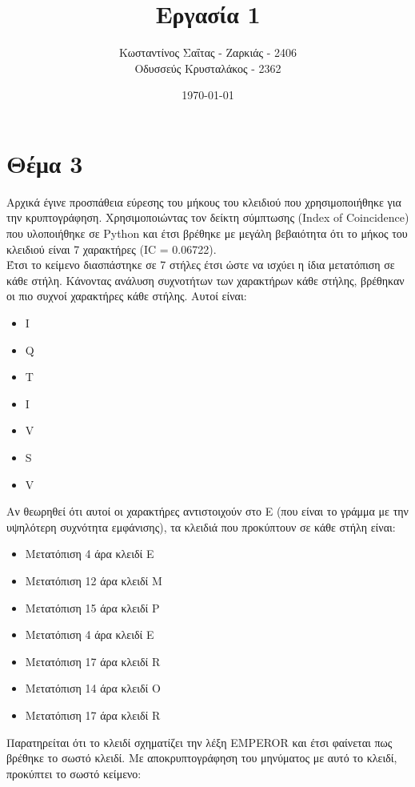 \documentclass[a4paper, 11pt]{article}
\title{Εργασία 1}
\author{Κωσταντίνος Σαΐτας - Ζαρκιάς - 2406 \\ Οδυσσεύς Κρυσταλάκος - 2362}
\date{\today}
\newcommand{\lt}{\latintext}
\begin{document}
\maketitle

\section*{Θέμα 3}
Αρχικά έγινε προσπάθεια εύρεσης του μήκους του κλειδιού που χρησιμοποιήθηκε για την κρυπτογράφηση.
Χρησιμοποιώντας τον δείκτη σύμπτωσης ({\lt Index of Coincidence}) που υλοποιήθηκε σε {\lt Python} και έτσι βρέθηκε
με μεγάλη βεβαιότητα ότι το μήκος του κλειδιού είναι 7 χαρακτήρες ({\lt IC} = 0.06722).
\\
Έτσι το κείμενο διασπάστηκε σε 7 στήλες έτσι ώστε να ισχύει η ίδια μετατόπιση σε κάθε στήλη. Κάνοντας ανάλυση συχνοτήτων
των χαρακτήρων κάθε στήλης, βρέθηκαν οι πιο συχνοί χαρακτήρες κάθε στήλης. Αυτοί είναι:

{\lt
\begin{itemize}
	\item I
	\item Q
	\item T
	\item I
	\item V
	\item S
	\item V
\end{itemize}
}

Αν θεωρηθεί ότι αυτοί οι χαρακτήρες αντιστοιχούν στο {\lt E} (που είναι το γράμμα με την υψηλότερη συχνότητα εμφάνισης), τα
κλειδιά που προκύπτουν σε κάθε στήλη είναι:

\begin{itemize}
	\item Μετατόπιση 4 άρα κλειδί {\lt E}
	\item Μετατόπιση 12 άρα κλειδί {\lt M}
	\item Μετατόπιση 15 άρα κλειδί {\lt P}
	\item Μετατόπιση 4 άρα κλειδί {\lt E}
	\item Μετατόπιση 17 άρα κλειδί {\lt R}
	\item Μετατόπιση 14 άρα κλειδί {\lt O}
	\item Μετατόπιση 17 άρα κλειδί {\lt R}
\end{itemize}

Παρατηρείται ότι το κλειδί σχηματίζει την λέξη {\lt EMPEROR} και έτσι φαίνεται πως βρέθηκε το σωστό κλειδί. Με αποκρυπτογράφηση του
μηνύματος με αυτό το κλειδί, προκύπτει το σωστό κείμενο:\\
\end{document}
